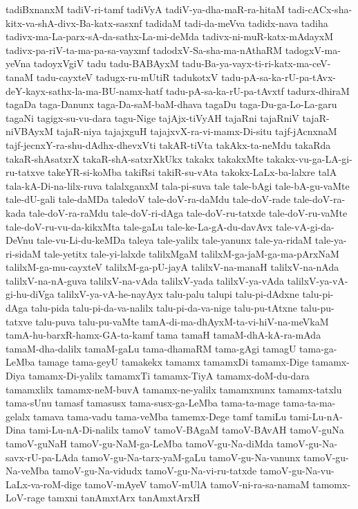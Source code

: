 {tadiBxnanxM
tadiV-ri-tamf
tadiVyA
tadiV-ya-dha-maR-ra-hitaM
tadi-cACx-sha-kitx-va-shA-divx-Ba-katx-sasxnf
tadidaM
tadi-da-meVva
tadidx-nava
tadiha
tadivx-ma-La-parx-sA-da-sathx-La-mi-deMda
tadivx-ni-muR-katx-mAdayxM
tadivx-pa-riV-ta-ma-pa-sa-vayxmf
tadodxV-Sa-sha-ma-nAthaRM
tadogxV-ma-yeVna
tadoyxVgiV
tadu
tadu-BABAyxM
tadu-Ba-ya-vayx-ti-ri-katx-ma-ceV-tanaM
tadu-cayxteV
tadugx-ru-mUtiR
tadukotxV
tadu-pA-sa-ka-rU-pa-tAvx-deY-kayx-sathx-la-ma-BU-namx-hatf
tadu-pA-sa-ka-rU-pa-tAvxtf
tadurx-dhiraM
tagaDa
taga-Danunx
taga-Da-saM-baM-dhava
tagaDu
taga-Du-ga-Lo-La-garu
tagaNi
tagigx-su-vu-dara
tagu-Nige
tajAjx-tiVyAH
tajaRni
tajaRniV
tajaR-niVBAyxM
tajaR-niya
tajajxguH
tajajxvX-ra-vi-mamx-Di-situ
tajf-jAcnxnaM
tajf-jecnxY-ra-shu-dAdhx-dhevxVti
takAR-tiVta
takAkx-ta-neMdu
takaRda
takaR-shAsatxrX
takaR-shA-satxrXkUkx
takakx
takakxMte
takakx-vu-ga-LA-gi-ru-tatxve
takeYR-si-koMba
takiRsi
takiR-su-vAta
takokx-LaLx-ba-lalxre
talA
tala-kA-Di-na-lilx-ruva
talalxganxM
tala-pi-suva
tale
tale-bAgi
tale-bA-gu-vaMte
tale-dU-gali
tale-daMDa
taledoV
tale-doV-ra-daMdu
tale-doV-rade
tale-doV-ra-kada
tale-doV-ra-raMdu
tale-doV-ri-dAga
tale-doV-ru-tatxde
tale-doV-ru-vaMte
tale-doV-ru-vu-da-kikxMta
tale-gaLu
tale-ke-La-gA-du-davAvx
tale-vA-gi-da-DeVnu
tale-vu-Li-du-keMDa
taleya
tale-yalilx
tale-yanunx
tale-ya-ridaM
tale-ya-ri-sidaM
tale-yetitx
tale-yi-lalxde
talilxMgaM
talilxM-ga-jaM-ga-ma-pArxNaM
talilxM-ga-mu-cayxteV
talilxM-ga-pU-jayA
talilxV-na-manaH
talilxV-na-nAda
talilxV-na-nA-guva
talilxV-na-vAda
talilxV-yada
talilxV-ya-vAda
talilxV-ya-vA-gi-hu-diVga
talilxV-ya-vA-he-nayAyx
talu-palu
talupi
talu-pi-dAdxne
talu-pi-dAga
talu-pida
talu-pi-da-va-nalilx
talu-pi-da-va-nige
talu-pu-tAtxne
talu-pu-tatxve
talu-puva
talu-pu-vaMte
tamA-di-ma-dhAyxM-ta-vi-hiV-na-meVkaM
tamA-hu-barxR-hamx-GA-ta-kamf
tama
tamaH
tamaM-dhA-kA-ra-mAda
tamaM-dha-dalilx
tamaM-gaLu
tama-dhamaRM
tama-gAgi
tamagU
tama-ga-LeMba
tamage
tama-geyU
tamakekx
tamamx
tamamxDi
tamamx-Dige
tamamx-Diya
tamamx-Di-yalilx
tamamxTi
tamamx-TiyA
tamamx-doM-du-dara
tamamxlilx
tamamx-neM-buvA
tamamx-ne-yalilx
tamamxnunx
tamamx-tatxlu
tama-sUnu
tamasf
tamasusx
tama-susx-ga-LeMba
tama-ta-mage
tama-ta-ma-gelalx
tamava
tama-vadu
tama-veMba
tamemx-Dege
tamf
tamiLu
tami-Lu-nA-Dina
tami-Lu-nA-Di-nalilx
tamoV
tamoV-BAgaM
tamoV-BAvAH
tamoV-guNa
tamoV-guNaH
tamoV-gu-NaM-ga-LeMba
tamoV-gu-Na-diMda
tamoV-gu-Na-savx-rU-pa-LAda
tamoV-gu-Na-tarx-yaM-gaLu
tamoV-gu-Na-vanunx
tamoV-gu-Na-veMba
tamoV-gu-Na-vidudx
tamoV-gu-Na-vi-ru-tatxde
tamoV-gu-Na-vu-LaLx-va-roM-dige
tamoV-mAyeV
tamoV-mUlA
tamoV-ni-ra-sa-namaM
tamomx-LoV-rage
tamxni
tanAmxtArx
tanAmxtArxH
}
